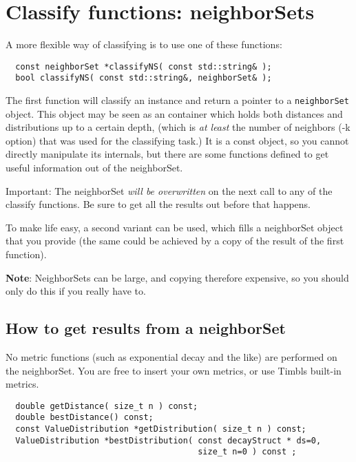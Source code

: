 \documentclass{report}
\begin{document}
\section{Classify functions: neighborSets}

A more flexible way of classifying is to use one of these functions:

\begin{footnotesize}
\begin{verbatim}
  const neighborSet *classifyNS( const std::string& );
  bool classifyNS( const std::string&, neighborSet& );
\end{verbatim}
\end{footnotesize}

The first function will classify an instance and return a pointer to a
{\tt neighborSet} object. This object may be seen as an container
which holds both distances and distributions up to a certain depth,
(which is {\em at least}\/ the number of neighbors (-k option) that
was used for the classifying task.)  It is a const object, so you
cannot directly manipulate its internals, but there are some
functions defined to get useful information out of the neighborSet.

Important:  The neighborSet {\em will be overwritten}\/ on the next
call to any of the classify functions. Be sure to get all the
results out before that happens.

To make life easy, a second variant can be used, which fills a
neighborSet object that you provide (the same could be achieved by a
copy of the result of the first function). 

{\bf Note}: NeighborSets can be large, and copying therefore
expensive, so you should only do this if you really have to.

\subsection{How to get results from a neighborSet}

No metric functions (such as exponential decay and the like) are
performed on the neighborSet. You are free to insert your own metrics, or
use Timbls built-in metrics.

\begin{footnotesize}
\begin{verbatim}
  double getDistance( size_t n ) const;
  double bestDistance() const;
  const ValueDistribution *getDistribution( size_t n ) const;
  ValueDistribution *bestDistribution( const decayStruct * ds=0,
                                       size_t n=0 ) const ;
\end{verbatim}
\end{footnotesize}
\end{document}
